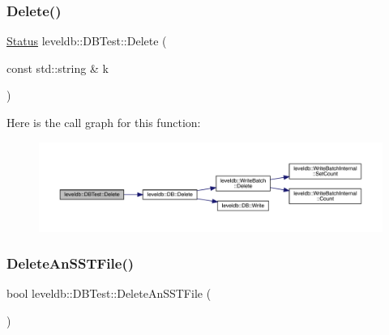 \subsubsection{\texorpdfstring{Delete()}{Delete()}}
{\footnotesize\ttfamily \mbox{\hyperlink{classleveldb_1_1_status}{Status}} leveldb\+::\+D\+B\+Test\+::\+Delete (\begin{DoxyParamCaption}\item[{const std\+::string \&}]{k }\end{DoxyParamCaption})\hspace{0.3cm}{\ttfamily [inline]}}

Here is the call graph for this function\+:
\nopagebreak
\begin{figure}[H]
\begin{center}
\leavevmode
\includegraphics[width=350pt]{classleveldb_1_1_d_b_test_a25716ec93d525adbeea8ff71e8f3a9f4_cgraph}
\end{center}
\end{figure}
\mbox{\label{classleveldb_1_1_d_b_test_abcb2ebeb0733670d7634079c587426d2}} 
\subsubsection{\texorpdfstring{DeleteAnSSTFile()}{DeleteAnSSTFile()}}
{\footnotesize\ttfamily bool leveldb\+::\+D\+B\+Test\+::\+Delete\+An\+S\+S\+T\+File (\begin{DoxyParamCaption}{ }\end{DoxyParamCaption})\hspace{0.3cm}{\ttfamily [inline]}}

